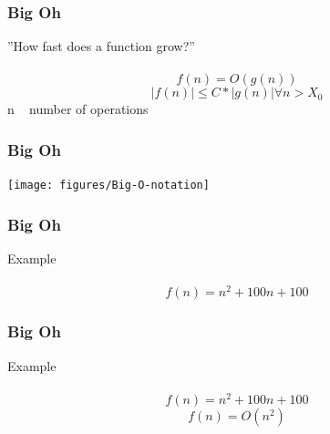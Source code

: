 \documentclass{beamer}
\begin{document}
\begin{frame}
	\frametitle{Big Oh}
	\begin{center}
		''How fast does a function grow?'' \\~\\
		\begin{equation*}
			f(n) = O(g(n))
		\end{equation*}
		\begin{equation*}
			|f(n)| \leq C * |g(n)| \forall n > X_0
		\end{equation*}
		n ~ number of operations
	\end{center}
\end{frame}

\begin{frame}
	\frametitle{Big Oh}
	\begin{table}[t]
		\begin{center}
			\texttt{[image: figures/Big-O-notation]}
		\end{center}
	\end{table}
\end{frame}

\begin{frame}
	\frametitle{Big Oh}
	\begin{center}
		Example \\~\\
		\begin{equation*}
		f(n) = n^2 + 100 n + 100
		\end{equation*}
	\end{center}
\end{frame}

\begin{frame}
	\frametitle{Big Oh}
	\begin{center}
		Example \\~\\
		\begin{equation*}
		f(n) = n^2 + 100 n + 100
		\end{equation*}
		\begin{equation*}
		f(n) = O(n^2)
		\end{equation*}
	\end{center}
\end{frame}
\end{document}
